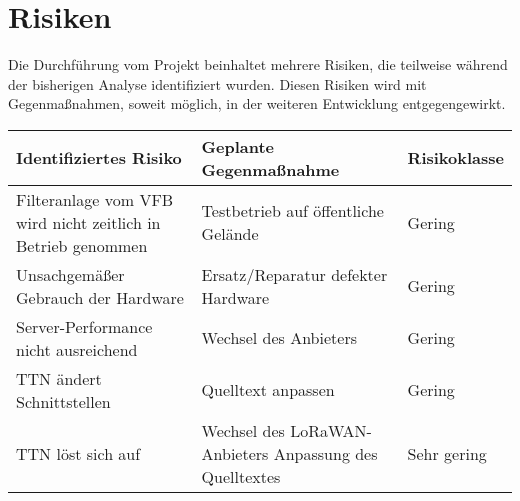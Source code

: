 \section{Risiken}

Die Durchf\"uhrung vom Projekt beinhaltet mehrere Risiken, die teilweise w\"ahrend der bisherigen Analyse identifiziert wurden. Diesen Risiken wird mit Gegenmaßnahmen, soweit m\"oglich, in der weiteren Entwicklung entgegengewirkt.

\begin{table}[H] %
\begin{tabularx}{\textwidth}{ |X|X|X| }
	\hline  %
	\rowcolor[gray]{.8}%
	\rule{0pt}{18pt}%
	\textbf{Identifiziertes Risiko} & \textbf{Geplante Gegenmaßnahme} & \textbf{Risikoklasse} \\
	\hline  %
	Filteranlage vom VFB wird nicht zeitlich in Betrieb genommen &
	Testbetrieb auf \"offentliche Gelände & Gering \\
	\hline
	Unsachgemäßer Gebrauch der Hardware &
	Ersatz/Reparatur defekter Hardware & Gering \\
	\hline
	Server-Performance nicht ausreichend &
	Wechsel des Anbieters & Gering \\
	\hline
	TTN \"andert Schnittstellen &
	Quelltext anpassen & Gering \\
	\hline
	TTN l\"ost sich auf &
	Wechsel des LoRaWAN-Anbieters
	Anpassung des Quelltextes & Sehr gering \\
	\hline
\end{tabularx}
\end{table}